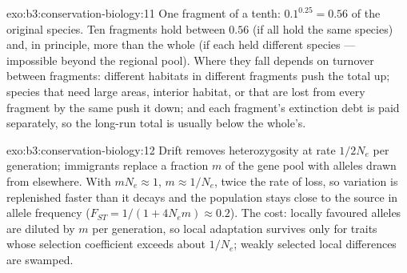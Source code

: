 \begin{solution}{exo:b3:conservation-biology:11}
One fragment of a tenth: $0.1^{0.25} = 0.56$ of the original species.
Ten fragments hold between $0.56$ (if all hold the same species) and,
in principle, more than the whole (if each held different species ---
impossible beyond the regional pool). Where they fall depends on
turnover between fragments: different habitats in different fragments
push the total up; species that need large areas, interior habitat, or
that are lost from every fragment by the same  push it
down; and each fragment's extinction debt is paid separately, so the
long-run total is usually below the whole's.
\end{solution}

\begin{solution}{exo:b3:conservation-biology:12}
Drift removes heterozygosity at rate $1/2N_{e}$ per generation;
immigrants replace a fraction $m$ of the gene pool with alleles drawn
from elsewhere. With $mN_{e} \approx 1$, $m \approx 1/N_{e}$, twice the
rate of loss, so variation is replenished faster than it decays and the
population stays close to the source in allele frequency ($F_{ST} = 1/(1
+ 4N_{e}m) \approx 0.2$). The cost: locally favoured alleles are diluted
by $m$ per generation, so local adaptation survives only for traits
whose selection coefficient exceeds about $1/N_{e}$; weakly selected
local differences are swamped.
\end{solution}

